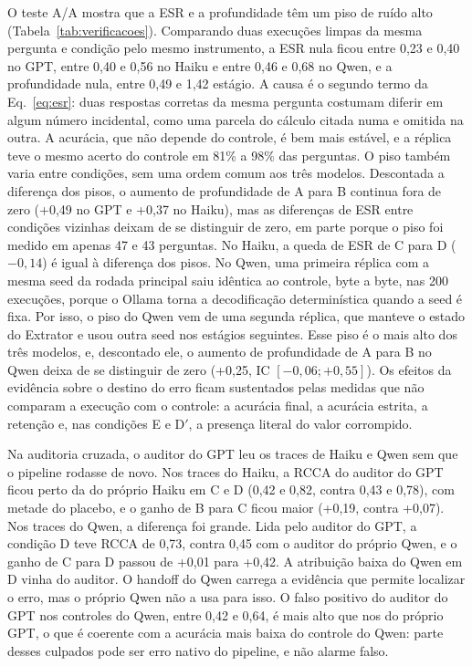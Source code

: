 O teste A/A mostra que a ESR e a profundidade têm um piso de ruído alto (Tabela~\ref{tab:verificacoes}).
Comparando duas execuções limpas da mesma pergunta e condição pelo mesmo instrumento, a ESR nula ficou entre 0,23 e 0,40 no GPT, entre 0,40 e 0,56 no Haiku e entre 0,46 e 0,68 no Qwen, e a profundidade nula, entre 0,49 e 1,42 estágio.
A causa é o segundo termo da Eq.~\ref{eq:esr}: duas respostas corretas da mesma pergunta costumam diferir em algum número incidental, como uma parcela do cálculo citada numa e omitida na outra.
A acurácia, que não depende do controle, é bem mais estável, e a réplica teve o mesmo acerto do controle em 81\% a 98\% das perguntas.
O piso também varia entre condições, sem uma ordem comum aos três modelos.
Descontada a diferença dos pisos, o aumento de profundidade de A para B continua fora de zero (+0,49 no GPT e +0,37 no Haiku), mas as diferenças de ESR entre condições vizinhas deixam de se distinguir de zero, em parte porque o piso foi medido em apenas 47 e 43 perguntas. No Haiku, a queda de ESR de C para D ($-0{,}14$) é igual à diferença dos pisos.
No Qwen, uma primeira réplica com a mesma seed da rodada principal saiu idêntica ao controle, byte a byte, nas 200 execuções, porque o Ollama torna a decodificação determinística quando a seed é fixa. Por isso, o piso do Qwen vem de uma segunda réplica, que manteve o estado do Extrator e usou outra seed nos estágios seguintes. Esse piso é o mais alto dos três modelos, e, descontado ele, o aumento de profundidade de A para B no Qwen deixa de se distinguir de zero (+0,25, IC $[-0{,}06; +0{,}55]$).
Os efeitos da evidência sobre o destino do erro ficam sustentados pelas medidas que não comparam a execução com o controle: a acurácia final, a acurácia estrita, a retenção e, nas condições E e D$'$, a presença literal do valor corrompido.

Na auditoria cruzada, o auditor do GPT leu os traces de Haiku e Qwen sem que o pipeline rodasse de novo.
Nos traces do Haiku, a RCCA do auditor do GPT ficou perto da do próprio Haiku em C e D (0,42 e 0,82, contra 0,43 e 0,78), com metade do placebo, e o ganho de B para C ficou maior (+0,19, contra +0,07).
Nos traces do Qwen, a diferença foi grande. Lida pelo auditor do GPT, a condição D teve RCCA de 0,73, contra 0,45 com o auditor do próprio Qwen, e o ganho de C para D passou de +0,01 para +0,42.
A atribuição baixa do Qwen em D vinha do auditor. O handoff do Qwen carrega a evidência que permite localizar o erro, mas o próprio Qwen não a usa para isso.
O falso positivo do auditor do GPT nos controles do Qwen, entre 0,42 e 0,64, é mais alto que nos do próprio GPT, o que é coerente com a acurácia mais baixa do controle do Qwen: parte desses culpados pode ser erro nativo do pipeline, e não alarme falso.
